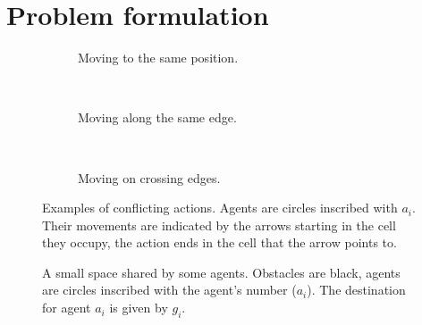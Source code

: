 \section{Problem formulation}\label{sec:problem}

\begin{figure}[t]
    \centering
    \begin{subfigure}[b]{.18\textwidth}
        \centering
        \def\svgscale{.5}
        
        \caption{Moving to the same position.}
        \label{fig:conflict-position}
    \end{subfigure}
    ~
    \begin{subfigure}[b]{.13\textwidth}
        \centering
        \def\svgscale{.5}
        
        \caption{Moving along the same edge.}
        \label{fig:conflict-same}
    \end{subfigure}
    ~
    \begin{subfigure}[b]{.13\textwidth}
        \centering
        \def\svgscale{.5}
        
        \caption{Moving on crossing edges.}
        \label{fig:conflict-crossing}
    \end{subfigure}
    \caption{Examples of conflicting actions. Agents are circles inscribed with
        $a_i$. Their movements are indicated by the arrows starting in the cell
        they occupy, the action ends in the cell that the arrow points to.}
    \label{fig:conflicts}
\end{figure}

\begin{figure}[t]
    \centering
    \def\svgscale{.5}
    
    \caption{A small space shared by some agents. Obstacles are black, agents
        are circles inscribed with the agent's number ($a_i$). The destination
        for agent $a_i$ is given by $g_i$.}
    \label{fig:world}
\end{figure}

